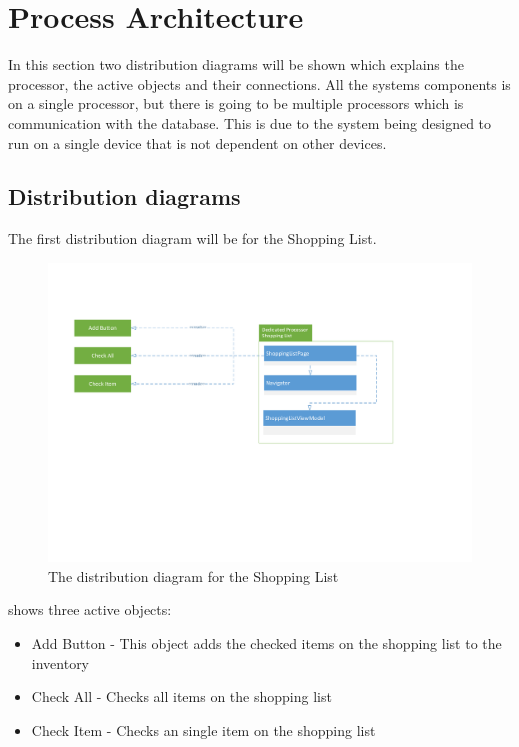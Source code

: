 \section{Process Architecture} \label{ProcessArchitecture}
In this section two distribution diagrams will be shown which explains the processor, the active objects and their connections. All the systems components is on a single processor, but there is going to be multiple processors which is communication with the database. This is due to the system being designed to run on a single device that is not dependent on other devices.

\subsection{Distribution diagrams}
The first distribution diagram will be for the Shopping List.

\begin{figure}[H]
\includegraphics[width =\linewidth, clip=true, trim=1.5cm 8cm 5.5cm 3cm]{Grafik/FoodPlanner/DistributionShoppingList}
\centering
\caption{The distribution diagram for the Shopping List}
\label{SLD}
\end{figure}

 shows three active objects:
\begin{itemize}
\item Add Button 
- This object adds the checked items on the shopping list to the inventory
\item Check All 
- Checks all items on the shopping list 
\item Check Item 
- Checks an single item on the shopping list
\end{itemize}

